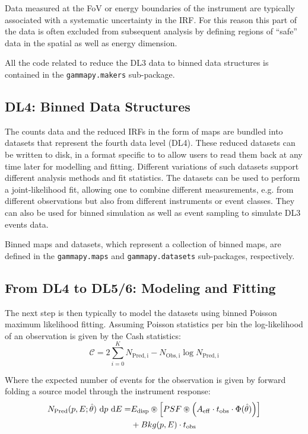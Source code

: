 \documentclass[longauth]{aa}
\newcommand{\code}[1]{\texttt{#1}}
\begin{document}
Data measured at the FoV or energy boundaries of the instrument are typically
associated with a systematic uncertainty in the IRF. For this reason this part 
of the data is often excluded from subsequent analysis by defining regions of
\enquote{safe} data in the spatial as well as energy dimension.

All the code related to reduce the DL3 data to binned data structures 
is contained in the \code{gammapy.makers} sub-package.


\subsection{DL4: Binned Data Structures}
The counts data and the reduced IRFs in the form of maps are bundled into datasets
that represent the fourth data level (DL4). These reduced datasets can be written to disk,
in a format specific to \gammapy to allow users to read them back at any time later
for modelling and fitting. Different variations of such datasets support different 
analysis methods and fit statistics. The datasets can be used to perform a joint-likelihood
fit, allowing one to combine different measurements, e.g. from different observations
but also from different instruments or event classes. They can also be used for binned
simulation as well as event sampling to simulate DL3 events data.

Binned maps and datasets, which represent a collection of binned
maps, are defined in the \code{gammapy.maps} and \code{gammapy.datasets}
sub-packages, respectively. 


\subsection{From DL4 to DL5/6: Modeling and Fitting}
The next step is then typically to model the datasets using binned Poisson maximum likelihood fitting.
Assuming Poisson statistics per bin the log-likelihood of an observation is given by the Cash statistics\citep{Cash}:
%
\begin{equation}
	\mathcal{C} = 2 \sum_{i=0}^K N_{\mathrm{Pred, i}} - N_{\mathrm{Obs, i}} \log{N_{\mathrm{Pred, i}}} 
\end{equation}

Where the expected number of events for the observation is given by forward folding a source model through
the instrument response:
 \begin{equation}
	 \begin{split}
		N_{\mathrm{Pred}}(p, E; \hat{\theta})\ {\rm d}p\ {\rm d}E =  &E_{\rm disp} \circledast \left[ PSF \circledast \left( A_{\rm eff} \cdot t_{\rm obs} \cdot \Phi(\hat{\theta}) \right) \right]\\
						& + Bkg(p, E) \cdot t_{\rm obs}
	 \end{split}
 \end{equation}
\end{document}
